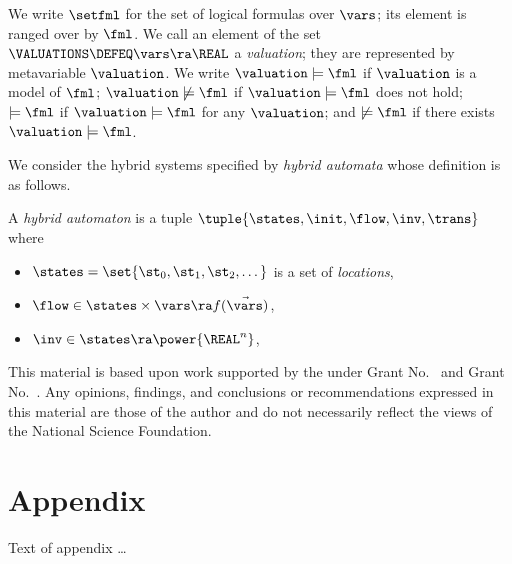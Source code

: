 \documentclass[acmsmall,review,anonymous]{acmart}\settopmatter{printfolios=true,printccs=false,printacmref=false}
\begin{document}
We write $\setfml$ for the set of logical formulas over $\vars$; its
element is ranged over by $\fml$.   We call
an element of the set $\VALUATIONS \DEFEQ \vars \ra \REAL$ a
\emph{valuation}; they are represented by metavariable $\valuation$.
We write $\valuation \models \fml$ if $\valuation$ is a model of
$\fml$; $\valuation \not\models \fml$ if $\valuation \models \fml$ does
not hold; $\models \fml$ if $\valuation \models \fml$ for any
$\valuation$; and $\not\models \fml$ if there exists
$\valuation \models \fml$.

We consider the hybrid systems specified by \emph{hybrid automata}
whose definition is as follows.
\begin{definition}
  A \emph{hybrid automaton} is a tuple
  $\tuple{\states,\init,\flow,\inv,\trans}$ where
  \begin{itemize}
  \item $\states = \set{\st_0,\st_1,\st_2,\dots}$ is a set of
    \emph{locations},
  \item $\flow \in \states \times \vars \ra f(\vec\vars)$,
  \item $\inv \in \states \ra \power{\REAL^n}$,
  \end{itemize}
\end{definition}



% 

\begin{acks}                            %
  This material is based upon work supported by the
   under Grant
  No.~ and Grant
  No.~.  Any opinions, findings, and
  conclusions or recommendations expressed in this material are those
  of the author and do not necessarily reflect the views of the
  National Science Foundation.
\end{acks}





\appendix
\section{Appendix}

Text of appendix \ldots
\end{document}
